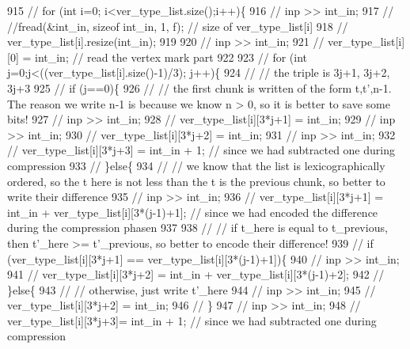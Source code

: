 \begin{DoxyCode}
915   \textcolor{comment}{// for (int i=0; i<ver\_type\_list.size();i++)\{}
916   \textcolor{comment}{//   inp >> int\_in;}
917   \textcolor{comment}{//   //fread(&int\_in, sizeof int\_in, 1, f); // size of ver\_type\_list[i]}
918   \textcolor{comment}{//   ver\_type\_list[i].resize(int\_in);}
919 
920   \textcolor{comment}{//   inp >> int\_in;}
921   \textcolor{comment}{//   ver\_type\_list[i][0] = int\_in; // read the vertex mark part}
922 
923   \textcolor{comment}{//   for (int j=0;j<((ver\_type\_list[i].size()-1)/3); j++)\{}
924   \textcolor{comment}{//     // the triple is 3j+1, 3j+2, 3j+3}
925   \textcolor{comment}{//     if (j==0)\{}
926   \textcolor{comment}{//       // the first chunk is written of the form t,t',n-1. The reason we write n-1 is because we know n
       > 0, so it is better to save some bits!}
927   \textcolor{comment}{//       inp >> int\_in;}
928   \textcolor{comment}{//       ver\_type\_list[i][3*j+1] = int\_in;}
929   \textcolor{comment}{//       inp >> int\_in;}
930   \textcolor{comment}{//       ver\_type\_list[i][3*j+2] = int\_in;}
931   \textcolor{comment}{//       inp >> int\_in;}
932   \textcolor{comment}{//       ver\_type\_list[i][3*j+3] = int\_in + 1; // since we had subtracted one during compression}
933   \textcolor{comment}{//     \}else\{}
934   \textcolor{comment}{//       // we know that the list is lexicographically ordered, so the t here is not less than the t is
       the previous chunk, so better to write their difference}
935   \textcolor{comment}{//       inp >> int\_in;}
936   \textcolor{comment}{//       ver\_type\_list[i][3*j+1] = int\_in + ver\_type\_list[i][3*(j-1)+1]; // since we had encoded the
       difference during the compression phasen}
937 
938   \textcolor{comment}{//       // if t\_here is equal to t\_previous, then t'\_here >= t'\_previous, so better to encode their
       difference!}
939   \textcolor{comment}{//       if (ver\_type\_list[i][3*j+1] == ver\_type\_list[i][3*(j-1)+1])\{}
940   \textcolor{comment}{//         inp >> int\_in;}
941   \textcolor{comment}{//         ver\_type\_list[i][3*j+2] = int\_in + ver\_type\_list[i][3*(j-1)+2];}
942   \textcolor{comment}{//       \}else\{}
943   \textcolor{comment}{//         // otherwise, just write t'\_here}
944   \textcolor{comment}{//         inp >> int\_in;}
945   \textcolor{comment}{//         ver\_type\_list[i][3*j+2] = int\_in;}
946   \textcolor{comment}{//       \}}
947   \textcolor{comment}{//       inp >> int\_in;}
948   \textcolor{comment}{//       ver\_type\_list[i][3*j+3]= int\_in + 1; // since we had subtracted one during compression}

\end{DoxyCode}
